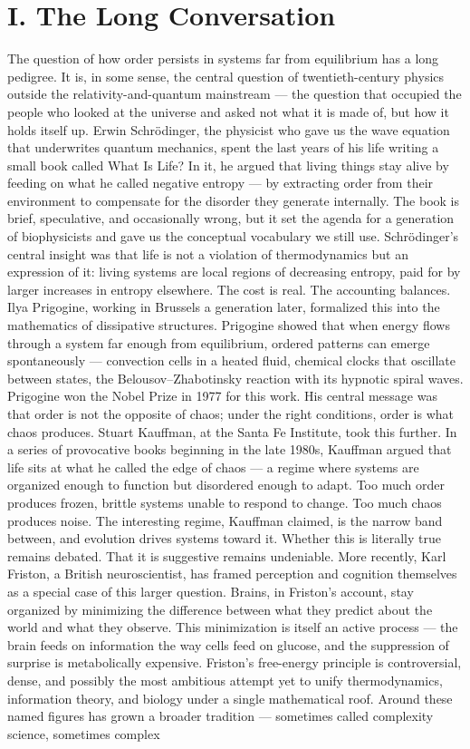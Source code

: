 \documentclass[12pt]{article}
\begin{document}
\section*{I. The Long Conversation}

The question of how order persists in systems far from equilibrium has a long pedigree. It is, in some sense, the central question of twentieth-century physics outside the relativity-and-quantum mainstream --- the question that occupied the people who looked at the universe and asked not what it is made of, but how it holds itself up. Erwin Schr{\"o}dinger, the physicist who gave us the wave equation that underwrites quantum mechanics, spent the last years of his life writing a small book called What Is Life? In it, he argued that living things stay alive by feeding on what he called negative entropy --- by extracting order from their environment to compensate for the disorder they generate internally. The book is brief, speculative, and occasionally wrong, but it set the agenda for a generation of biophysicists and gave us the conceptual vocabulary we still use. Schr{\"o}dinger's central insight was that life is not a violation of thermodynamics but an expression of it: living systems are local regions of decreasing entropy, paid for by larger increases in entropy elsewhere. The cost is real. The accounting balances. Ilya Prigogine, working in Brussels a generation later, formalized this into the mathematics of dissipative structures. Prigogine showed that when energy flows through a system far enough from equilibrium, ordered patterns can emerge spontaneously --- convection cells in a heated fluid, chemical clocks that oscillate between states, the Belousov--Zhabotinsky reaction with its hypnotic spiral waves. Prigogine won the Nobel Prize in 1977 for this work. His central message was that order is not the opposite of chaos; under the right conditions, order is what chaos produces. Stuart Kauffman, at the Santa Fe Institute, took this further. In a series of provocative books beginning in the late 1980s, Kauffman argued that life sits at what he called the edge of chaos --- a regime where systems are organized enough to function but disordered enough to adapt. Too much order produces frozen, brittle systems unable to respond to change. Too much chaos produces noise. The interesting regime, Kauffman claimed, is the narrow band between, and evolution drives systems toward it. Whether this is literally true remains debated. That it is suggestive remains undeniable. More recently, Karl Friston, a British neuroscientist, has framed perception and cognition themselves as a special case of this larger question. Brains, in Friston's account, stay organized by minimizing the difference between what they predict about the world and what they observe. This minimization is itself an active process --- the brain feeds on information the way cells feed on glucose, and the suppression of surprise is metabolically expensive. Friston's free-energy principle is controversial, dense, and possibly the most ambitious attempt yet to unify thermodynamics, information theory, and biology under a single mathematical roof. Around these named figures has grown a broader tradition --- sometimes called complexity science, sometimes complex 
\end{document}
